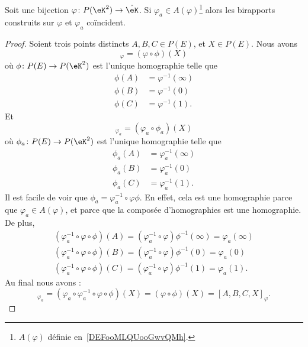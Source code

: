 \begin{proposition}     \label{PROPooTFMQooIOQGvs}
	Soit une bijection \( \varphi\colon P(\eK^2)\to \hat\eK\). Si \( \varphi_a\in A(\varphi)\)\footnote{\( A(\varphi)\) définie en~\ref{DEFooMLQUooGwvQMh}.} alors les birapports construits sur \( \varphi\) et \( \varphi_a\) coïncident.
\end{proposition}

\begin{proof}
	Soient trois points distincts \( A,B,C\in P(E)\), et \( X\in P(E)\). Nous avons
	\begin{equation}
		[A,B,C,X]_{\varphi}=(\varphi\circ\phi)(X)
	\end{equation}
	où \( \phi\colon P(E)\to P(\eK^2)\) est l'unique homographie telle que
	\begin{subequations}
		\begin{align}
			\phi(A) & =\varphi^{-1}(\infty) \\
			\phi(B) & =\varphi^{-1}(0)      \\
			\phi(C) & =\varphi^{-1}(1).
		\end{align}
	\end{subequations}
	Et
	\begin{equation}
		[A,B,C,X]_{\varphi_a}=(\varphi_a\circ\phi_a)(X)
	\end{equation}
	où \( \phi_a\colon P(E)\to P(\eK^2)\) est l'unique homographie telle que
	\begin{subequations}
		\begin{align}
			\phi_a(A) & =\varphi_a^{-1}(\infty) \\
			\phi_a(B) & =\varphi_a^{-1}(0)      \\
			\phi_a(C) & =\varphi_a^{-1}(1).
		\end{align}
	\end{subequations}
	Il est facile de voir que \( \phi_a=\varphi_a^{-1}\circ\varphi\phi\). En effet, cela est une homographie parce que \( \varphi_a\in A(\varphi)\), et parce que la composée d'homographies est une homographie. De plus,
	\begin{subequations}
		\begin{align}
			(\varphi_a^{-1}\circ\varphi\circ\phi)(A)=(\varphi_a^{-1}\circ\varphi)\phi^{-1}(\infty)=\varphi_a(\infty) \\
			(\varphi_a^{-1}\circ\varphi\circ\phi)(B)=(\varphi_a^{-1}\circ\varphi)\phi^{-1}(0)=\varphi_a(0)           \\
			(\varphi_a^{-1}\circ\varphi\circ\phi)(C)=(\varphi_a^{-1}\circ\varphi)\phi^{-1}(1)=\varphi_a(1).
		\end{align}
	\end{subequations}
	Au final nous avons :
	\begin{equation}
		[A,B,C,X]_{\varphi_a}=(\varphi_a\circ\varphi_a^{-1}\circ\varphi\circ\phi)(X)=(\varphi\circ\phi)(X)=[A,B,C,X]_{\varphi}.
	\end{equation}
\end{proof}

